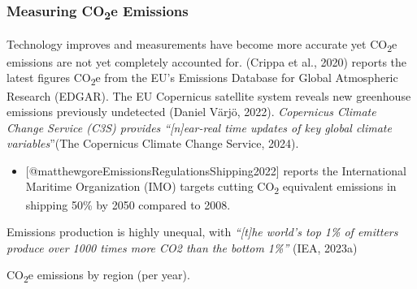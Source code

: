 \documentclass[
  letterpaper,
  DIV=11,
  numbers=noendperiod]{scrartcl}
\providecommand{\tightlist}{%
  \setlength{\itemsep}{0pt}\setlength{\parskip}{0pt}}\usepackage{longtable,booktabs,array}
\begin{document}
\subsubsection{\texorpdfstring{Measuring CO\textsubscript{2}e
Emissions}{Measuring CO2e Emissions}}\label{measuring-co2e-emissions}

Technology improves and measurements have become more accurate yet
CO\textsubscript{2}e emissions are not yet completely accounted for.
(Crippa et al., 2020) reports the latest figures CO\textsubscript{2}e
from the EU's Emissions Database for Global Atmospheric Research
(EDGAR). The EU Copernicus satellite system reveals new greenhouse
emissions previously undetected (Daniel Värjö, 2022). \emph{Copernicus
Climate Change Service (C3S) provides ``{[}n{]}ear-real time updates of
key global climate variables}''(The Copernicus Climate Change Service,
2024).

\begin{itemize}
\tightlist
\item
  {[}@matthewgoreEmissionsRegulationsShipping2022{]} reports the
  International Maritime Organization (IMO) targets cutting
  CO\textsubscript{2} equivalent emissions in shipping 50\% by 2050
  compared to 2008.
\end{itemize}

Emissions production is highly unequal, with \emph{``{[}t{]}he world's
top 1\% of emitters produce over 1000 times more CO2 than the bottom
1\%''} (IEA, 2023a)

CO\textsubscript{2}e emissions by region (per year).
\end{document}
